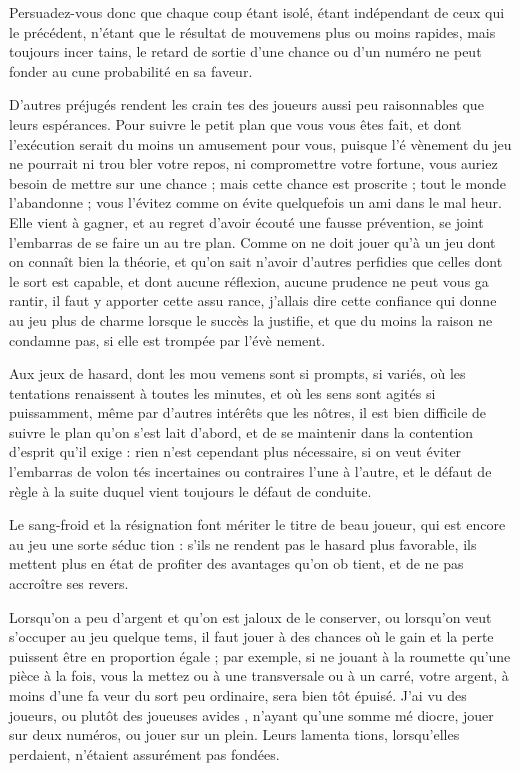 Persuadez-vous donc que chaque
coup étant isolé, étant indépendant
de ceux qui le précédent, n'étant que
le résultat de mouvemens plus ou
moins rapides, mais toujours incer%
tains, le retard de sortie d'une chance
ou d'un numéro ne peut fonder au%
cune probabilité en sa faveur.

D'autres préjugés rendent les crain%
tes des joueurs aussi peu raisonnables
que leurs espérances. Pour suivre le
petit plan que vous vous êtes fait, et
dont l'exécution serait du moins un
amusement pour vous, puisque l'é%
vènement du jeu ne pourrait ni trou%
bler votre repos, ni compromettre
votre fortune, vous auriez besoin de
mettre sur une chance ; mais cette
chance est proscrite ; tout le monde
l'abandonne ; vous l'évitez comme on
évite quelquefois un ami dans le mal%
heur. Elle vient à gagner, et au regret
d'avoir écouté une fausse prévention,
se joint l'embarras de se faire un au%
tre plan. Comme on ne doit jouer
qu'à un jeu dont on connaît bien la
théorie, et qu'on sait n'avoir d'autres
perfidies que celles dont le sort est
capable, et dont aucune réflexion,
aucune prudence ne peut vous ga%
rantir, il faut y apporter cette assu%
rance, j'allais dire cette confiance
qui donne au jeu plus de charme
lorsque le succès la justifie, et que
du moins la raison ne condamne
pas, si elle est trompée par l'évè%
nement.

Aux jeux de hasard, dont les mou%
vemens sont si prompts, si variés,
où les tentations renaissent à toutes
les minutes, et où les sens sont agités
si puissamment, même par d'autres
intérêts que les nôtres, il est bien
difficile de suivre le plan qu'on s'est
lait d'abord, et de se maintenir dans la
contention d'esprit qu'il exige : rien
n'est cependant plus nécessaire, si
on veut éviter l'embarras de volon%
tés incertaines ou contraires l'une à
l'autre, et le défaut de règle à la suite
duquel vient toujours le défaut de
conduite.

Le sang-froid et la résignation font
mériter le titre de beau joueur, qui
est encore au jeu une sorte séduc%
tion : s'ils ne rendent pas le hasard
plus favorable, ils mettent plus en
état de profiter des avantages qu'on ob%
tient, et de ne pas accroître ses revers.

Lorsqu'on a peu d'argent et qu'on est
jaloux de le conserver, ou lorsqu'on
veut s'occuper au jeu quelque tems,
il faut jouer à des chances où le gain
et la perte puissent être en proportion
égale ; par exemple, si ne jouant à la
roumette qu'une pièce à la fois, vous la
mettez ou à une transversale ou à un
carré, votre argent, à moins d'une fa%
veur du sort peu ordinaire, sera bien%
tôt épuisé. J'ai vu des joueurs, ou
plutôt des joueuses avides , n'ayant qu'une somme mé%
diocre, jouer sur deux numéros, ou
jouer sur un plein. Leurs lamenta%
tions, lorsqu'elles perdaient, n'étaient
assurément pas fondées.

